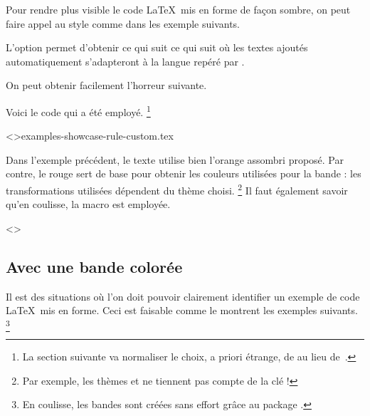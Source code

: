 Pour rendre plus visible le code \LaTeX\ mis en forme de façon sombre, on peut faire appel au style  comme dans les exemple suivants.


\begin{tdocexa}
	L'option  permet d'obtenir ce qui suit ce qui suit où les textes ajoutés automatiquement s'adapteront à la langue repéré par \thisproj.

	
\end{tdocexa}


\begin{tdocexa}
	On peut obtenir facilement l'horreur suivante.

	
	
	Voici le code qui a été employé.%
	\footnote{
		La section suivante va normaliser le choix, a priori étrange, de  au lieu de \,.
	}

	\tdoclatexinput<>{examples-showcase-rule-custom.tex}
\end{tdocexa}


\begin{tdocnote}
    Dans l'exemple précédent, le texte utilise bien l'orange assombri proposé. Par contre, le rouge sert de base pour obtenir les couleurs utilisées pour la bande : les transformations utilisées dépendent du thème choisi.%
    \footnote{
        Par exemple, les thèmes  et  ne tiennent pas compte de la clé  !
    }
    Il faut également savoir qu'en coulisse, la macro  est employée.

    \begin{tdoclatex}<>
    \end{tdoclatex}
\end{tdocnote}


\subsection{Avec une bande colorée}

Il est des situations où l'on doit pouvoir clairement identifier un exemple de code \LaTeX\ mis en forme. Ceci est faisable comme le montrent les exemples suivants.%
\footnote{
    En coulisse, les bandes sont créées sans effort grâce au package .
}


